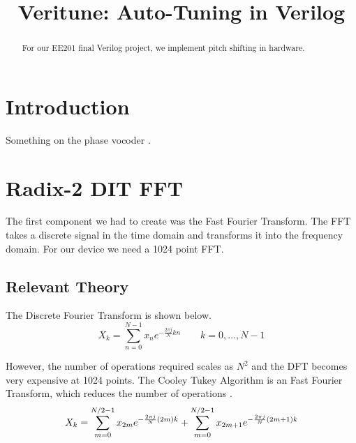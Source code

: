\documentclass[twoside]{article}
\title{Veritune: Auto-Tuning in Verilog}
\begin{document}
\maketitle
%
\begin{abstract}
	For our EE201 final Verilog project, we implement pitch shifting in hardware.
\end{abstract}

%
%
%
%
\section{Introduction}
  Something on the phase vocoder \cite{bib:guitarpitchshifter}.
  
%
%
%
%
\section{Radix-2 DIT FFT}
  The first component we had to create was the Fast Fourier Transform. The FFT takes a discrete signal in the time domain and 
  transforms it into the frequency domain. For our device we need a 1024 point FFT.
  \subsection{Relevant Theory}
  The Discrete Fourier Transform is shown below.
  \begin{equation}
  	X_k = \sum_{n=0}^{N-1} x_n e^{-\frac{2 \pi j}{N} k n} \quad \quad k = 0, \dots, N-1
  	\label{eqn:dft}
  \end{equation}
  
  However, the number of operations required scales as $N^2$ and the DFT becomes very expensive at 1024 points.
  The Cooley Tukey Algorithm is an Fast Fourier Transform, which reduces the number of operations \cite{bib:ctdft}.
  \begin{equation}
  	 X_k  =	 \sum \limits_{m=0}^{N/2-1} x_{2m}     e^{-\frac{2\pi j}{N} (2m)k}\\   +  \sum \limits_{m=0}^{N/2-1} x_{2m+1} e^{-\frac{2\pi j}{N} (2m+1)k}
  	\label{eqn:ctdft}
  \end{equation} 
  
\end{document}
